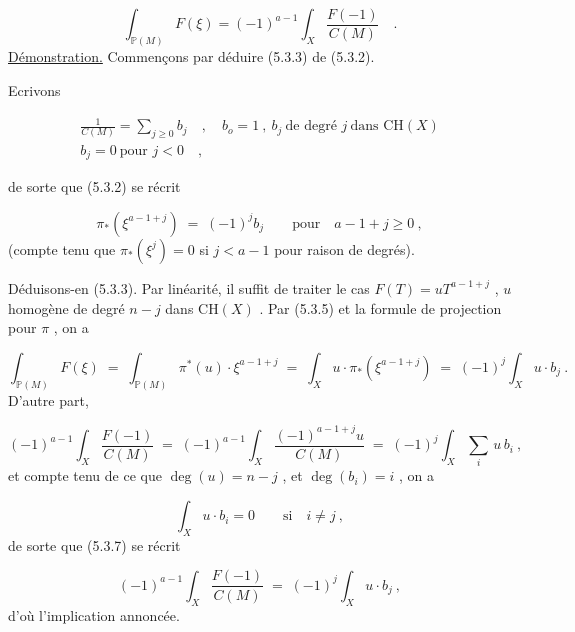 \begin{equation}\tag{5.3.3}
\int_{\mathbb{P}(M)} F(\xi) = (-1)^{a-1} \int_X \frac{F(-1)}{C(M)} \quad .
\end{equation}
\underline{Démonstration.} Commençons par déduire (5.3.3) de (5.3.2).

Ecrivons

\begin{equation}\tag{5.3.4}
\begin{gathered} \frac{1}{C(M)} = \sum_{j \geq 0} b_j \quad , \quad b_o = 1 \ , \ b_j \ \text{de degré } j \ \text{dans } \mathrm{CH}(X) \\ b_j = 0 \ \text{pour } j < 0 \quad , \end{gathered}
\end{equation}

de sorte que (5.3.2) se récrit

\begin{equation}\tag{5.3.5}
\pi_*(\xi^{a-1+j}) \;=\; (-1)^j b_j \qquad \mbox{pour} \quad a-1+j \geq 0 \ ,
\end{equation}
(compte tenu que $\pi_*(\xi^j) = 0$ si $j < a-1$ pour raison de degrés).

Déduisons-en (5.3.3). Par linéarité, il suffit de traiter le cas $F(T) = uT^{a-1+j}$ , $u$ homogène de degré $n-j$ dans $\mathrm{CH}(X)$ . Par (5.3.5) et la formule de projection pour $\pi$ , on a

\begin{equation}\tag{5.3.6}
\int_{\mathbb{P}(M)} F(\xi) \;=\; \int_{\mathbb{P}(M)} \pi^*(u) \cdot \xi^{a-1+j} \;=\; \int_X u \cdot \pi_*(\xi^{a-1+j}) \;=\; (-1)^j \int_X u \cdot b_j \ .
\end{equation}
D'autre part,

\begin{equation}\tag*{5.3.7.}
(-1)^{a-1} \int_X \frac{F(-1)}{C(M)} \;=\; (-1)^{a-1} \int_X \frac{(-1)^{a-1+j}u}{C(M)} \;=\; (-1)^j \int_X \sum_i \, u \, b_i \ ,
\end{equation}
et compte tenu de ce que $\deg(u) = n-j$ , et $\deg(b_i) = i$ , on a

\begin{equation*}
\int_X u \cdot b_i = 0 \qquad \mbox{si} \quad i \neq j \ ,
\end{equation*}
de sorte que (5.3.7) se récrit

\begin{equation}\tag{5.3.8}
(-1)^{a-1} \int_X \frac{F(-1)}{C(M)} \;=\; (-1)^j \int_X u \cdot b_j \ ,
\end{equation}
d'où l'implication annoncée.

